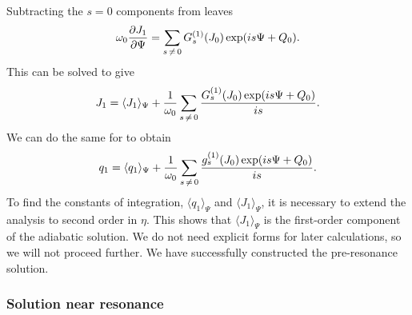 Subtracting the $s = 0$ components from  leaves
\begin{equation}
\omega_0\dfrac{\partial {J_1}}{\partial {\Psi}} = \sum_{s\,\neq\,0} G_s^{(1)}(J_0)\exp(is \Psi + Q_0).
\end{equation}
This can be solved to give
\begin{equation}
J_1 = \langle J_1\rangle_\Psi + \dfrac{1}{\omega_0}\sum_{s\,\neq\,0} \dfrac{G_s^{(1)}(J_0)\exp(is \Psi + Q_0)}{is}.
\label{eq:J-1-sol}
\end{equation}
We can do the same for  to obtain
\begin{equation}
q_1 = \langle q_1\rangle_\Psi + \dfrac{1}{\omega_0}\sum_{s\,\neq\,0} \dfrac{g_s^{(1)}(J_0)\exp(is \Psi + Q_0)}{is}.
\label{eq:q-1-sol}
\end{equation}
To find the constants of integration, $\langle q_1\rangle_\Psi$ and $\langle J_1\rangle_\Psi$, it is necessary to extend the analysis to second order in $\eta$. This shows that $\langle J_1\rangle_\Psi$ is the first-order component of the adiabatic solution. We do not need explicit forms for later calculations, so we will not proceed further. We have successfully constructed the pre-resonance solution.

\subsubsection{Solution near resonance}\label{sec:interior-res}

